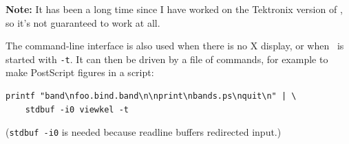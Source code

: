{\bf Note:}  It has been a long time since I have worked on the
Tektronix version of \viewprog, so it's not guaranteed to work at all.

The command-line interface is also used when there is no X display, or
when \viewprog\ is started with {\tt -t}. It can then be driven by a file
of commands, for example to make PostScript figures in a script:

\shrinkspacing
\begin{verbatim}
printf "band\nfoo.bind.band\n\nprint\nbands.ps\nquit\n" | \
    stdbuf -i0 viewkel -t
\end{verbatim}
\resumespacing

\noindent ({\tt stdbuf -i0} is needed because readline buffers
redirected input.)

